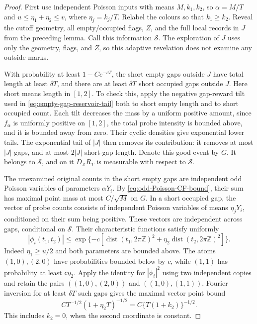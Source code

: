 \documentclass[11pt,letterpaper]{article}
\begin{document}
\begin{proof}
First use independent Poisson inputs with means $M,k_1,k_2$,
so $\alpha=M/T$ and $u\le\eta_1+\eta_2\le v$, where
$\eta_j=k_j/T$. Relabel the colours so that $k_1\ge k_2$.
Reveal the cutoff geometry, all empty/occupied flags, $Z$,
and the full local records in $J$ from the preceding lemma.
Call this information $\mathcal S$. The exploration of $J$
uses only the geometry, flags, and $Z$, so this adaptive
revelation does not examine any outside marks.

With probability at least $1-Ce^{-cT}$, the short empty gaps
outside $J$ have total length at least $\delta T$, and there
are at least $\delta T$ short occupied gaps outside $J$.
Here short means length in $[1,2]$. To check this, apply the
negative gap-reward tilt used in
\eqref{eq:empty-gap-reservoir-tail} both to short empty length
and to short occupied count. Each tilt decreases the mass by
a uniform positive amount, since $f_\alpha$ is uniformly
positive on $[1,2]$, the total probe intensity is bounded above,
and it is bounded away from zero. Their cyclic densities give
exponential lower tails. The exponential tail of $|J|$ then
removes its contribution: it removes at most $|J|$ gaps, and
at most $2|J|$ short-gap length. Denote this good event by $G$.
It belongs to $\mathcal S$, and on it $D_ZR_T$ is measurable
with respect to $\mathcal S$.

The unexamined original counts in the short empty gaps are
independent odd Poisson variables of parameters $\alpha Y_i$.
By \eqref{eq:odd-Poisson-CF-bound}, their sum has maximal point
mass at most $C/\sqrt M$ on $G$.
In a short occupied gap, the vector of probe counts consists
of independent Poisson variables of means $\eta_jY_i$,
conditioned on their sum being positive. These vectors are
independent across gaps, conditional on $\mathcal S$.
Their characteristic functions satisfy uniformly
\[
 |\phi_i(t_1,t_2)|\le
 \exp\{-c[\operatorname{dist}(t_1,2\pi\mathbb Z)^2
       +\eta_2\operatorname{dist}(t_2,2\pi\mathbb Z)^2]\}.
\]
Indeed $\eta_1\ge u/2$ and both parameters are bounded above.
The atoms $(1,0),(2,0)$ have probabilities bounded below by
$c$, while $(1,1)$ has probability at least $c\eta_2$.
Apply the identity for $|\phi_i|^2$ using two independent
copies and retain the pairs $((1,0),(2,0))$ and
$((1,0),(1,1))$. Fourier inversion for at least $\delta T$
such gaps gives the maximal vector point bound
\[
 C T^{-1/2}(1+\eta_2T)^{-1/2}
             =C\{T(1+k_2)\}^{-1/2}.
\]
This includes $k_2=0$, when the second coordinate is constant.


\end{proof}
\end{document}
